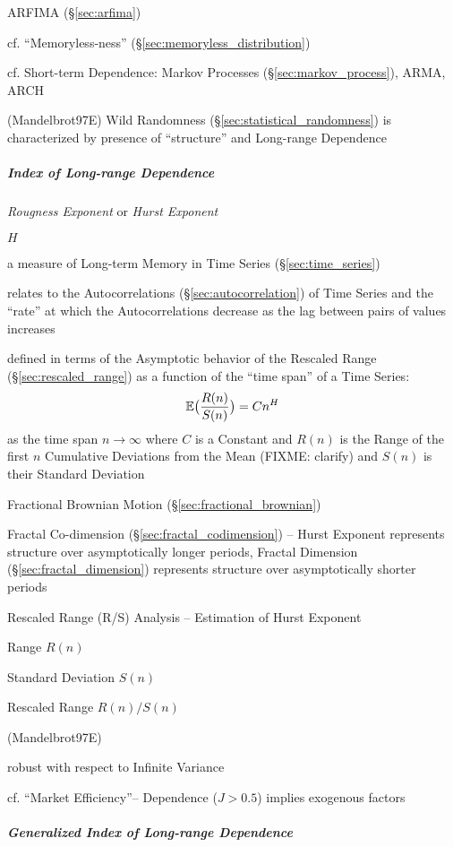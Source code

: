 \fist ARFIMA (\S\ref{sec:arfima})

cf. ``Memoryless-ness'' (\S\ref{sec:memoryless_distribution})

cf. Short-term Dependence: Markov Processes (\S\ref{sec:markov_process}), ARMA,
ARCH

(Mandelbrot97E) Wild Randomness (\S\ref{sec:statistical_randomness}) is
characterized by presence of ``structure'' and Long-range Dependence



\subparagraph{Index of Long-range Dependence}\label{sec:hurst_exponent}\hfill

\emph{Rougness Exponent} or \emph{Hurst Exponent}

$H$

a measure of Long-term Memory in Time Series (\S\ref{sec:time_series})

relates to the Autocorrelations (\S\ref{sec:autocorrelation}) of Time Series and
the ``rate'' at which the Autocorrelations decrease as the lag between pairs of
values increases

defined in terms of the Asymptotic behavior of the Rescaled Range
(\S\ref{sec:rescaled_range}) as a function of the ``time span'' of a Time
Series:
\[
  \mathbb{E}\big(\frac{R(n)}{S(n)}\big) = Cn^H
\]
as the time span $n \to \infty$ where $C$ is a Constant and $R(n)$ is the Range
of the first $n$ Cumulative Deviations from the Mean (FIXME: clarify) and $S(n)$
is their Standard Deviation

Fractional Brownian Motion (\S\ref{sec:fractional_brownian})

Fractal Co-dimension (\S\ref{sec:fractal_codimension}) -- Hurst Exponent
represents structure over asymptotically longer periods, Fractal Dimension
(\S\ref{sec:fractal_dimension}) represents structure over asymptotically shorter
periods

Rescaled Range (R/S) Analysis -- Estimation of Hurst Exponent

Range $R(n)$

Standard Deviation $S(n)$

Rescaled Range $R(n) / S(n)$

(Mandelbrot97E)

robust with respect to Infinite Variance

cf. ``Market Efficiency''-- Dependence ($J > 0.5$) implies exogenous factors



\subparagraph{Generalized Index of Long-range Dependence}
\label{sec:generalized_hurst}\hfill

